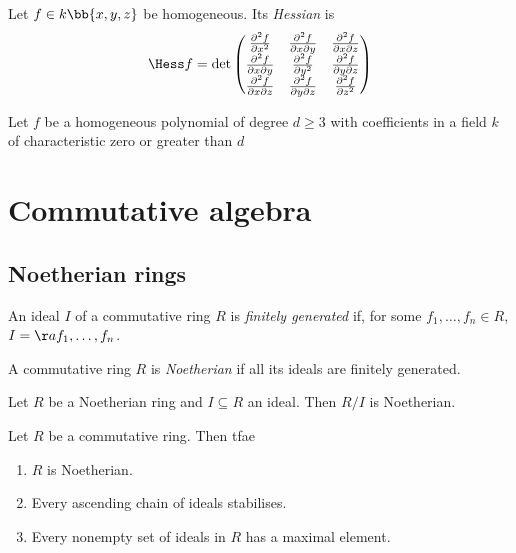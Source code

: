 \documentclass{article}
\begin{document}
\begin{definition}
  Let $f\in k\bb{x,y,z}$ be homogeneous. Its \emph{Hessian} is
  \begin{align*}
    \Hess f = \det
    \begin{pmatrix}
      \frac{\partial^2 f}{\partial x^2} &
      \frac{\partial^2 f}{\partial x\partial y} &
      \frac{\partial^2 f}{\partial x\partial z} \\
      \frac{\partial^2 f}{\partial x\partial y} &
      \frac{\partial^2 f}{\partial y^2} &
      \frac{\partial^2 f}{\partial y\partial z} \\
      \frac{\partial^2 f}{\partial x\partial z} &
      \frac{\partial^2 f}{\partial y\partial z} &
      \frac{\partial^2 f}{\partial z^2}
    \end{pmatrix}
  \end{align*}
\end{definition}

\begin{theorem}
  Let $f$ be a homogeneous polynomial of degree $d\geq 3$ with coefficients in a field
  $k$ of characteristic zero or greater than $d$
\end{theorem}

\section{Commutative algebra}

\subsection{Noetherian rings}

\begin{definition}
  An ideal $I$ of a commutative ring $R$ is \emph{finitely generated} if, for some
  $f_1,\ldots,f_n\in R$, $I=\aa{f_1,\ldots,f_n}$.
\end{definition}

\begin{definition}
  A commutative ring $R$ is \emph{Noetherian} if all its ideals are finitely generated.
\end{definition}

\begin{proposition}
  Let $R$ be a Noetherian ring and $I\subseteq R$ an ideal. Then $R/I$ is Noetherian.
\end{proposition}

\begin{theorem}
  Let $R$ be a commutative ring. Then tfae
  \begin{enumerate}
    \item $R$ is Noetherian.
    \item Every ascending chain of ideals stabilises.
    \item Every nonempty set of ideals in $R$ has a maximal element.
  \end{enumerate}
\end{theorem}
\end{document}

